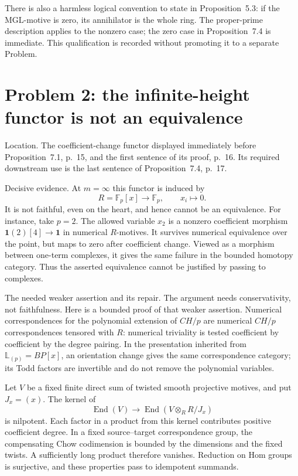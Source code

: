 \documentclass[10pt]{article}
\begin{document}
There is also a harmless logical convention to state in Proposition 5.3: if the \(\mathrm{MGL}\)-motive is zero, its annihilator is the whole ring. The proper-prime description applies to the nonzero case; the zero case in Proposition 7.4 is immediate. This qualification is recorded without promoting it to a separate Problem.\par
\section*{Problem 2: the infinite-height functor is not an equivalence}
Location. The coefficient-change functor displayed immediately before Proposition 7.1, p. 15, and the first sentence of its proof, p. 16. Its required downstream use is the last sentence of Proposition 7.4, p. 17.\par
Decisive evidence. At \(m=\infty\) this functor is induced by \[R=\mathbb F_p[x]\longrightarrow \mathbb F_p,\qquad x_i\longmapsto0.\] It is not faithful, even on the heart, and hence cannot be an equivalence. For instance, take \(p=2\). The allowed variable \(x_2\) is a nonzero coefficient morphism \(\mathbf1(2)[4]\to\mathbf1\) in numerical \(R\)-motives. It survives numerical equivalence over the point, but maps to zero after coefficient change. Viewed as a morphism between one-term complexes, it gives the same failure in the bounded homotopy category. Thus the asserted equivalence cannot be justified by passing to complexes.\par
The needed weaker assertion and its repair. The argument needs conservativity, not faithfulness. Here is a bounded proof of that weaker assertion. Numerical correspondences for the polynomial extension of \(CH/p\) are numerical \(CH/p\) correspondences tensored with \(R\): numerical triviality is tested coefficient by coefficient by the degree pairing. In the presentation inherited from \(\mathbb L_{(p)}=BP[x]\), an orientation change gives the same correspondence category; its Todd factors are invertible and do not remove the polynomial variables.\par
Let \(V\) be a fixed finite direct sum of twisted smooth projective motives, and put \(J_x=(x)\). The kernel of \[\operatorname{End}(V)\longrightarrow\operatorname{End}(V\otimes_R R/J_x)\] is nilpotent. Each factor in a product from this kernel contributes positive coefficient degree. In a fixed source–target correspondence group, the compensating Chow codimension is bounded by the dimensions and the fixed twists. A sufficiently long product therefore vanishes. Reduction on Hom groups is surjective, and these properties pass to idempotent summands.\par
\end{document}
